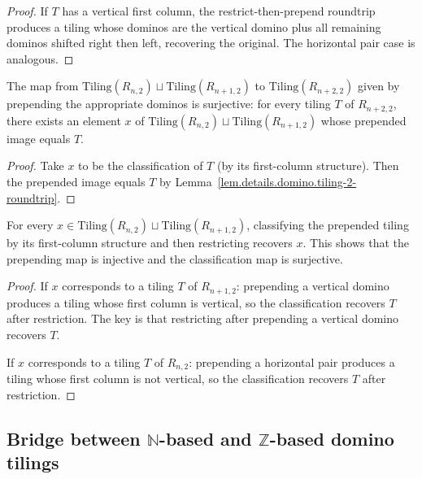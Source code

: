 \begin{proof}
If $T$ has a vertical first column, the restrict-then-prepend roundtrip
produces a tiling whose dominos are the vertical domino plus all remaining
dominos shifted right then left, recovering the original. The horizontal
pair case is analogous.
\end{proof}

\begin{lemma}
\label{lem.details.domino.tiling-2-from-sum-surjective}
\leanhelper
\leanok
The map from $\mathrm{Tiling}(R_{n,2}) \sqcup \mathrm{Tiling}(R_{n+1,2})$
to $\mathrm{Tiling}(R_{n+2,2})$ given by prepending the appropriate dominos
is surjective:
for every tiling $T$ of $R_{n+2,2}$, there exists an element $x$ of
$\mathrm{Tiling}(R_{n,2}) \sqcup \mathrm{Tiling}(R_{n+1,2})$ whose
prepended image equals $T$.
\end{lemma}

\begin{proof}
\leanok
Take $x$ to be the classification of $T$ (by its first-column structure). Then
the prepended image equals $T$ by
Lemma~\ref{lem.details.domino.tiling-2-roundtrip}.
\end{proof}

\begin{lemma}
\label{lem.details.domino.tiling-2-to-sum-from-sum}
\leanhelper
\leanok
For every $x \in \mathrm{Tiling}(R_{n,2}) \sqcup \mathrm{Tiling}(R_{n+1,2})$,
classifying the prepended tiling by its first-column structure and then
restricting recovers $x$.
This shows that the prepending map is injective and
the classification map is surjective.
\end{lemma}

\begin{proof}
\leanok
If $x$ corresponds to a tiling $T$ of $R_{n+1,2}$: prepending a vertical
domino produces a tiling whose first column is vertical,
so the classification recovers $T$ after restriction.
The key is that restricting after prepending a vertical domino recovers $T$.

If $x$ corresponds to a tiling $T$ of $R_{n,2}$: prepending a horizontal pair
produces a tiling whose first column is not vertical, so the classification
recovers $T$ after restriction.
\end{proof}

\subsection{Bridge between $\mathbb{N}$-based and $\mathbb{Z}$-based domino tilings}

